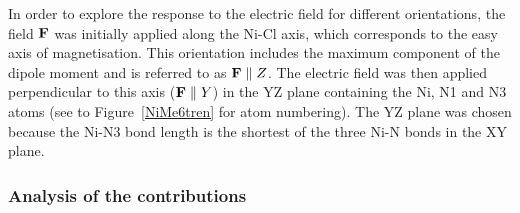 \documentclass[12pt]{report}
\numberwithin{equation}{section}
\begin{document}
In order to explore the response to the electric field for different orientations, the field $\vb{F}$ was initially applied along the Ni-Cl axis, which corresponds to the easy axis of magnetisation.
This orientation includes the maximum component of the dipole moment and is referred to as $\vb{F}\parallel Z$.
The electric field was then applied perpendicular to this axis ($\vb{F}\parallel Y$) in the YZ plane containing the Ni, N1 and N3 atoms (see to Figure~\ref{NiMe6tren} for atom numbering). 
The YZ plane was chosen because the Ni-N3 bond length is the shortest of the three Ni-N bonds in the XY plane.

\subsubsection*{Analysis of the contributions}
\end{document}
